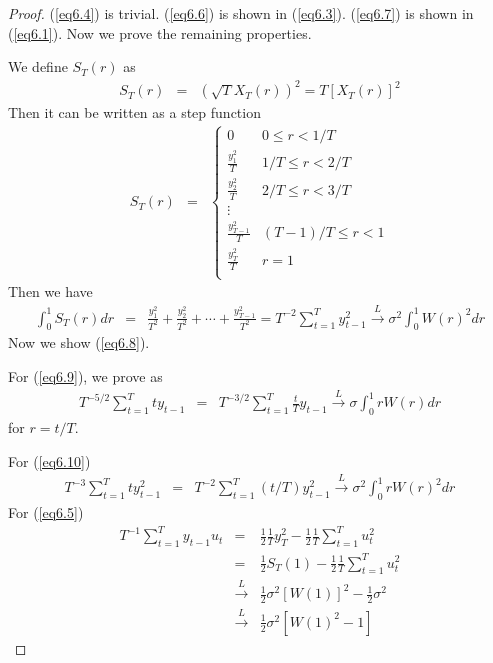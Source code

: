 \documentclass{article}
\begin{document}
\begin{proof}
(\ref{eq6.4}) is trivial. (\ref{eq6.6}) is shown in (\ref{eq6.3}). (\ref{eq6.7}) is shown in (\ref{eq6.1}). Now we prove the remaining properties. 

We define $S_{T}(r)$ as 
\begin{eqnarray*}
S_{T}(r)&=&\left(\sqrt{T}X_{T}(r)\right)^{2}=T[X_{T}(r)]^{2}
\end{eqnarray*}
Then it can be written as a step function 
\begin{eqnarray*}
S_{T}(r)&=&\begin{cases}
0							&	0\leq r<1/T\\
\frac{y_{1}^{2}}{T}				&	1/T\leq r<2/T\\
\frac{y_{2}^{2}}{T}				&	2/T\leq r<3/T\\
\vdots						&				\\
\frac{y_{T-1}^{2}}{T}			&	(T-1)/T\leq r<1\\
\frac{y_{T}^{2}}{T}				&	r=1\\
\end{cases}
\end{eqnarray*}
Then we have
\begin{eqnarray}
\label{eq4.12}
\int_{0}^{1}S_{T}(r)dr&=&\frac{y_{1}^{2}}{T^{2}}+\frac{y_{2}^{2}}{T^{2}}+\cdots+\frac{y_{T-1}^{2}}{T^{2}}=T^{-2}\sum_{t=1}^{T}y_{t-1}^{2}\xrightarrow{L}\sigma^{2}\int_{0}^{1}W(r)^{2}dr
\end{eqnarray}
Now we show (\ref{eq6.8}).

For (\ref{eq6.9}), we prove as
\begin{eqnarray*}
T^{-5/2}\sum_{t=1}^{T}ty_{t-1}&=&T^{-3/2}\sum_{t=1}^{T}\frac{t}{T}y_{t-1}\xrightarrow{L}\sigma\int_{0}^{1}rW(r)dr
\end{eqnarray*}
for $r=t/T$.

For (\ref{eq6.10})
\begin{eqnarray*}
T^{-3}\sum_{t=1}^{T}ty_{t-1}^{2}&=&T^{-2}\sum_{t=1}^{T}(t/T)y_{t-1}^{2}\xrightarrow{L}\sigma^{2}\int_{0}^{1}rW(r)^{2}dr
\end{eqnarray*}
For (\ref{eq6.5})
\begin{eqnarray*}
T^{-1}\sum_{t=1}^{T}y_{t-1}u_{t}&=&\frac{1}{2}\frac{1}{T}y_{T}^{2}-\frac{1}{2}\frac{1}{T}\sum_{t=1}^{T}u_{t}^{2}\\
&=&\frac{1}{2}S_{T}(1)-\frac{1}{2}\frac{1}{T}\sum_{t=1}^{T}u_{t}^{2}\\
&\xrightarrow{L}&\frac{1}{2}\sigma^{2}[W(1)]^{2}-\frac{1}{2}\sigma^{2}\\
&\xrightarrow{L}&\frac{1}{2}\sigma^{2} [W(1)^{2}-1]
\end{eqnarray*}
\end{proof}
\end{document}
